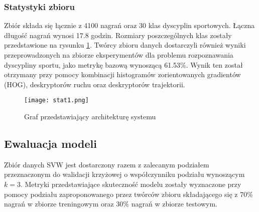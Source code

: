 \subsubsection{Statystyki zbioru}
Zbiór składa się łącznie z 4100 nagrań oraz 30 klas dyscyplin sportowych. Łączna długość nagrań wynosi 17.8 godzin. Rozmiary
poszczególnych klas zostały przedstawione na rysunku \ref{fig:raw-class-histogram}.
Twórcy zbioru danych dostarczyli również wyniki przeprowadzonych na zbiorze eksperymentów dla problemu rozpoznawania
dyscypliny sportu, jako metrykę bazową wynoszącą 61.53\%. Wynik ten został otrzymany przy pomocy kombinacji histogramów
zorientowanych gradientów (HOG), deskryptorów ruchu oraz deskryptorów trajektorii.
\begin{figure}[!h]
    \centering \texttt{[image: stat1.png]}
    \caption{Graf przedstawiający architekturę systemu}
    \label{fig:raw-class-histogram}
\end{figure}
\subsection{Ewaluacja modeli}
Zbiór danych SVW jest dostarczony razem z zalecanym podziałem przeznaczonym do walidacji krzyżowej o współczynniku
podziału wynoszącym $k = 3$. Metryki przedstawiające skuteczność modelu zostały wyznaczone przy pomocy podziału
zaproponowanego przez twórców zbioru składającego się z 70\% nagrań w zbiorze treningowym oraz 30\% nagrań w zbiorze testowym. 



